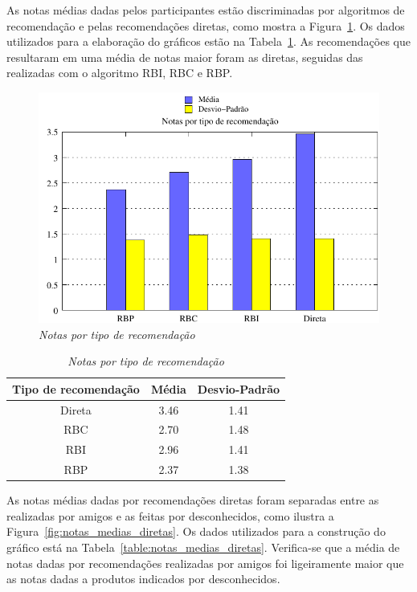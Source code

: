  As notas médias dadas pelos participantes estão discriminadas por algoritmos de recomendação e pelas recomendações diretas, como mostra a Figura~\ref{fig:notas_medias}. Os dados utilizados para a elaboração do gráficos estão na Tabela~\ref{table:notas_medias}. As recomendações que resultaram em uma média de notas maior foram as diretas, seguidas das realizadas com o algoritmo RBI, RBC e RBP.
 
\begin{figure}
    \centering
    \includegraphics[width=\textwidth]{imagens/grafico_notas_medias}
    \caption{\it Notas por tipo de recomendação}
    \label{fig:notas_medias}
\end{figure}

\begin{table}
\centering
\begin{tabular}{c c c}
    \hline \hline
    \textbf{Tipo de recomendação} & \textbf{Média}& \textbf{Desvio-Padrão} \\
\hline 
Direta & 3.46 & 1.41 \\
\hline 
RBC & 2.70 & 1.48 \\
\hline 
RBI & 2.96 & 1.41 \\
\hline 
RBP & 2.37 & 1.38 \\
\hline        
\end{tabular}
\caption{\it Notas por tipo de recomendação}
\label{table:notas_medias}
\end{table}

 As notas médias dadas por recomendações diretas foram separadas entre as realizadas por amigos e as feitas por desconhecidos, como ilustra a Figura~\ref{fig:notas_medias_diretas}. Os dados utilizados para a construção do gráfico está na Tabela~\ref{table:notas_medias_diretas}. Verifica-se que a média de notas dadas por recomendações realizadas por amigos foi ligeiramente maior que as notas dadas a produtos indicados por desconhecidos.

